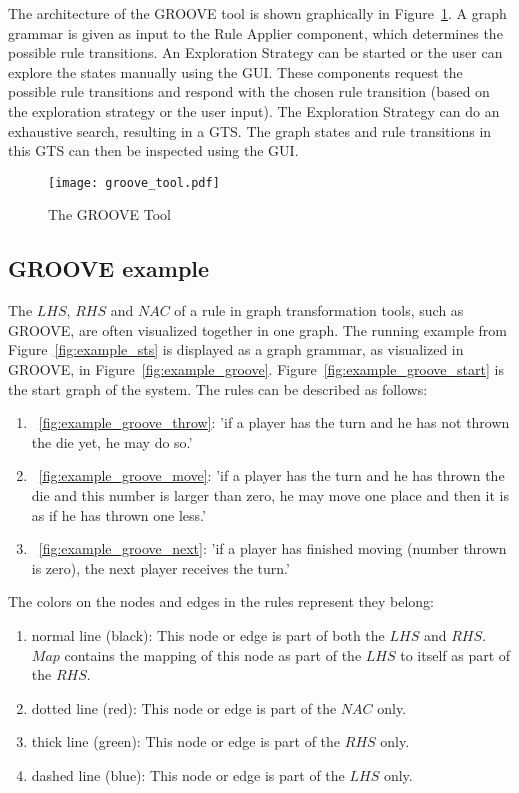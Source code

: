 The architecture of the GROOVE tool is shown graphically in Figure~\ref{fig:groove_tool}. A graph grammar is given as input to the Rule Applier component, which determines the possible rule transitions. An Exploration Strategy can be started or the user can explore the states manually using the GUI. These components request the possible rule transitions and respond with the chosen rule transition (based on the exploration strategy or the user input). The Exploration Strategy can do an exhaustive search, resulting in a GTS. The graph states and rule transitions in this GTS can then be inspected using the GUI.

\begin{figure}[h]
  \begin{center}
    \texttt{[image: groove\_tool.pdf]}
  \end{center}
  \caption{The GROOVE Tool}
  \label{fig:groove_tool}
\end{figure}

\subsection{GROOVE example}
The $\mathit{LHS}$, $\mathit{RHS}$ and $\mathit{NAC}$ of a rule in graph transformation tools, such as GROOVE, are often visualized together in one graph. The running example from Figure~\ref{fig:example_sts} is displayed as a graph grammar, as visualized in GROOVE, in Figure~\ref{fig:example_groove}. Figure~\ref{fig:example_groove_start} is the start graph of the system. The rules can be described as follows:
\begin{enumerate}
  \item~\ref{fig:example_groove_throw}: 'if a player has the turn and he has not thrown the die yet, he may do so.'
  \item~\ref{fig:example_groove_move}: 'if a player has the turn and he has thrown the die and this number is larger than zero, he may move one place and then it is as if he has thrown one less.'
  \item~\ref{fig:example_groove_next}: 'if a player has finished moving (number thrown is zero), the next player receives the turn.'
\end{enumerate}

The colors on the nodes and edges in the rules represent   they belong:
\begin{enumerate}
  \item normal line (black): This node or edge is part of both the $\mathit{LHS}$ and $\mathit{RHS}$. $\mathit{Map}$ contains the mapping of this node as part of the $\mathit{LHS}$ to itself as part of the $\mathit{RHS}$.
  \item dotted line (red): This node or edge is part of the $\mathit{NAC}$ only.
  \item thick line (green): This node or edge is part of the $\mathit{RHS}$ only.
  \item dashed line (blue): This node or edge is part of the $\mathit{LHS}$ only.
\end{enumerate}

